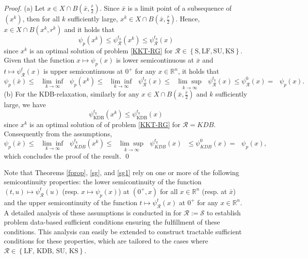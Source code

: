 \begin{proof}
 (a) Let $x\in X\cap B(\bar{x},\frac{\bar{r}}{2} )$. Since  $\bar{x}$ is a limit point of a subsequence of $(x^{k})$, then for all $k$ sufficiently large, $x^{k}\in X\cap B(\bar{x},\frac{\bar{r}}{2})$. Hence, $x\in X\cap B(x^{k},r^{k} )$ and it holds that
	\[
	\psi_{p}(x^{k})\leq\psi_{\mathcal{R}}^{t_{k}}(x^{k})\leq\psi_{\mathcal{R}}^{t_{k}}(x)
	\]
	since $x^{k}$ is an optimal solution of problem \eqref{KKT-RG} for $\mathcal{R}\in \left\{\mbox{S}, \mbox{LF}, \mbox{SU}, \mbox{KS}\right\}$. Given that  the function $x\mapsto\psi_{p}(x)$ is lower semicontinuous at  $\bar{x}$ and  $t\mapsto\psi_{\mathcal{R}}^{t}(x)$ is upper semicontinuous at $0^+$ for any $x \in \mathbb{R}^n$, it holds that 
	\begin{equation*}
	\psi_{p}(\bar{x})\leq\text{ }\underset{k\rightarrow\infty}{\lim\inf}\text{ }\psi
	_{p}(x^{k})\leq\text{ }\underset{k\rightarrow\infty}{\lim\inf}\text{ }\psi_{\mathcal{R}}^{t_{k}
	}(x)\leq\text{ }\underset{k\rightarrow\infty}{\lim\sup}\text{ }\psi_{\mathcal{R}}^{t_{k}
	}(x)\leq \psi_{\mathcal{R}}^{0
	}(x)=\text{ }\psi_{p}(x).
	\end{equation*} 
(b) For the KDB-relaxation,  similarly for any $x\in X\cap B(\bar{x},\frac{\bar{r}}{2} )$ and $k$ sufficiently large,  we have 
	\[
	\psi_{\text{KDB}}^{t_{k}}(x^{k})\leq\psi_{\text{KDB}}^{t_{k}}(x)
	\]
	since $x^{k}$ is an optimal solution of of problem \eqref{KKT-RG} for $\mathcal{R}=KDB$. Consequently from the assumptions, 
	\begin{equation*}
	\psi_{p}(\bar{x})\leq\text{ }\underset{k\rightarrow\infty}{\lim\inf}\text{ }\psi
	^{t_{k}}_{KDB}(x^{k})\leq\text{ }\underset{k\rightarrow\infty}{\lim\sup}\text{ }\psi_{KDB}^{t_{k}
	}(x)\text{ }\leq \psi_{KDB}^{0
	}(x)=\text{ }\psi_{p}(x),
	\end{equation*} 
 which concludes the proof of the result. \hfill \qed
\end{proof}

\begin{remark}
Note that Theorems \ref{fprop}, \ref{sg}, and \ref{sg1} rely on one or more of the following semicontinuity properties: the lower semicontinuity of the function $(t,u)\mapsto\psi_{\mathcal{R}}^{t}(u)$ (resp. $x \mapsto \psi_{p}(x)$) at $(0^+,x)$ for all $x\in \mathbb{R}^n$ (resp. at $\bar{x}$) and the upper semicontinuity of the function $t\mapsto\psi_{\mathcal{R}}^{t}(x)$  at $0^+$ for any $x\in \mathbb{R}^n$. A detailed analysis of these assumptions is conducted in \cite{BNZ} for $\mathcal{R}:=\mathcal{S}$ to establish problem data-based sufficient conditions ensuring the fulfillment of these conditions. This analysis can easily be extended to construct tractable sufficient conditions for these properties, which are tailored to the cases where $\mathcal{R}\in  \left\{\mbox{LF}, \, \mbox{KDB},\, \mbox{SU},\, \mbox{KS}\right\}$. 
\end{remark}

